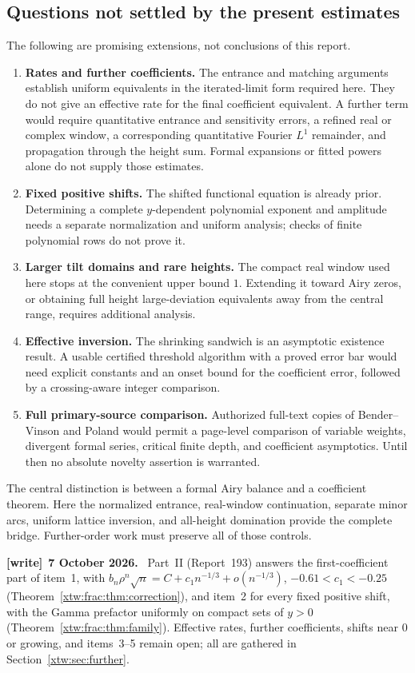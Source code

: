 \documentclass[11pt]{article}
\theoremstyle{remark}\newtheorem{remark}[theorem]{Remark}
\newenvironment{writenote}[1][]{\par\smallskip\begingroup\small
 \noindent\textbf{[write]}\if\relax\detokenize{#1}\relax\else~\textbf{#1.}\fi\ }%
 {\par\endgroup\smallskip}
\begin{document}
\subsection{Questions not settled by the present estimates}
The following are promising extensions, not conclusions of this report.
\begin{enumerate}
\item \textbf{Rates and further coefficients.} The entrance and matching
arguments establish uniform equivalents in the iterated-limit form required
here. They do not give an effective rate for the final coefficient equivalent.
A further term would require quantitative entrance and sensitivity errors,
a refined real or complex window, a corresponding quantitative Fourier
$L^1$ remainder, and propagation through the height sum. Formal expansions
or fitted powers alone do not supply those estimates.
\item \textbf{Fixed positive shifts.} The shifted functional equation is
already prior. Determining a complete $y$-dependent polynomial exponent and
amplitude needs a separate normalization and uniform analysis; checks of
finite polynomial rows do not prove it.
\item \textbf{Larger tilt domains and rare heights.} The compact real window
used here stops at the convenient upper bound $1$. Extending it toward Airy
zeros, or obtaining full height large-deviation equivalents away from the
central range, requires additional analysis.
\item \textbf{Effective inversion.} The shrinking sandwich is an asymptotic
existence result. A usable certified threshold algorithm with a proved error
bar would need explicit constants and an onset bound for the coefficient
error, followed by a crossing-aware integer comparison.
\item \textbf{Full primary-source comparison.} Authorized full-text copies of
Bender--Vinson and Poland would permit a page-level comparison of variable
weights, divergent formal series, critical finite depth, and coefficient
asymptotics. Until then no absolute novelty assertion is warranted.
\end{enumerate}
The central distinction is between a formal Airy balance and a coefficient
theorem. Here the normalized entrance, real-window continuation, separate
minor arcs, uniform lattice inversion, and all-height domination provide
the complete bridge. Further-order work must preserve all of those controls.
\begin{writenote}[7 October 2026]
Part~II (Report~193) answers the first-coefficient part of item~1, with $b_n\rho^n\sqrt n=C+c_1n^{-1/3}+o(n^{-1/3})$, $-0.61<c_1<-0.25$ (Theorem~\ref{xtw:frac:thm:correction}), and item~2 for every fixed positive shift, with the Gamma prefactor uniformly on compact sets of $y>0$ (Theorem~\ref{xtw:frac:thm:family}). Effective rates, further coefficients, shifts near $0$ or growing, and items~3--5 remain open; all are gathered in Section~\ref{xtw:sec:further}.
\end{writenote}
\end{document}
